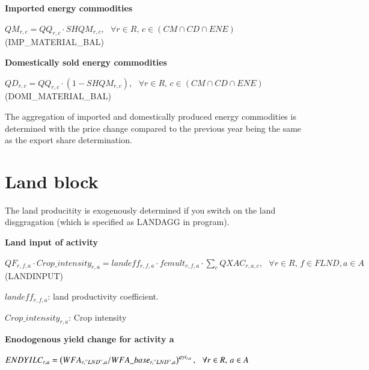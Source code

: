 \documentclass[10pt,a4paper,titlepage,dvipdfmx]{book}
\begin{document}
\begin{flushleft}\textbf{Imported energy commodities}\end{flushleft}


\begin{center}$QM_{r,c}=QQ_{r,c}\cdot SHQM_{r,c},\,\,\,\,\forall r\in R,\,c\in \left(CM\cap CD\cap ENE\right)$ (IMP\_MATERIAL\_BAL)
\end{center}

\begin{flushleft}\textbf{Domestically sold energy commodities}\end{flushleft}


\begin{center}$QD_{r,c}=QQ_{r,c}\cdot \left(1-SHQM_{r,c}\right),\,\,\,\,\forall r\in R,\,c\in \left(CM\cap CD\cap ENE\right)$ (DOMI\_MATERIAL\_BAL)
\end{center}

The aggregation of imported and domestically produced energy commodities is determined with the price change compared to the previous year being the same as the export share determination. 

\section{\label{sec:LanBlo}Land block}

The land producitity is exogenously determined if you switch on the land disggragation (which is specified as LANDAGG in program).

\begin{flushleft}\textbf{Land input of activity }\end{flushleft}


\begin{center}$QF_{r,f,a}\cdot Crop\_ intensity_{r,a}=landeff_{r,f,a}\cdot fcmult_{r,f,a}\cdot \sum _{c}QXAC_{r,a,c},\,\,\,\,\forall r\in R,\,f\in FLND,a\in A$ (LANDINPUT)
\end{center}

\begin{flushleft}
$landeff _{r,f,a}$: land productivity coefficient.

$Crop\_ intensity_{r,a}$: Crop intensity
\end{flushleft}

\begin{flushleft}\textbf{Enodogenous yield change for activity a }\end{flushleft}


\begin{center}$ENDYILC_{r,a}=\left(WFA_{r,"LND",a}/WFA\_ base _{r,"LND",a}\right)^{\varphi yi_{r,a}},\,\,\,\,\forall r\in R,\,a\in A$ 
\end{center}
\end{document}
